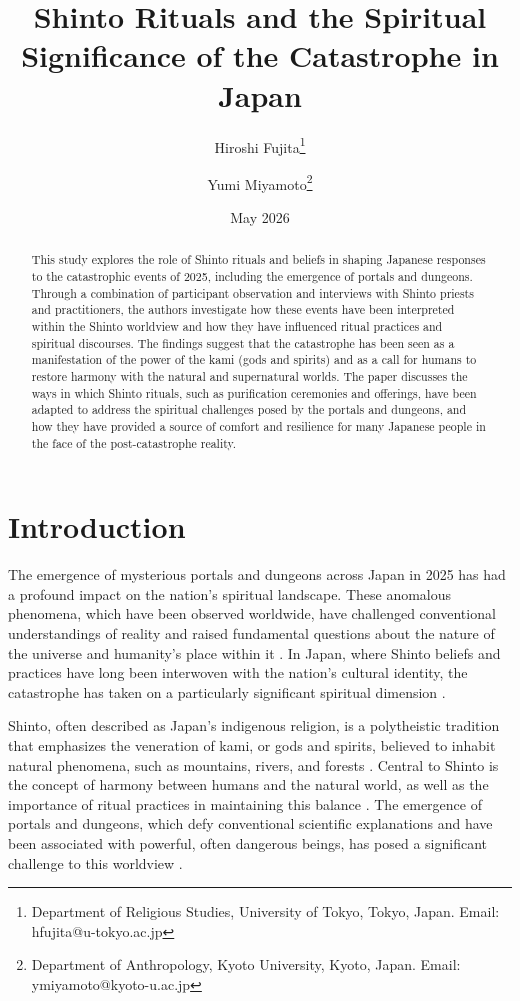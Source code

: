 \documentclass[12pt, a4paper]{article}
\title{Shinto Rituals and the Spiritual Significance of the Catastrophe in Japan}
\author{Hiroshi Fujita\thanks{Department of Religious Studies, University of Tokyo, Tokyo, Japan. Email: hfujita@u-tokyo.ac.jp} \and Yumi Miyamoto\thanks{Department of Anthropology, Kyoto University, Kyoto, Japan. Email: ymiyamoto@kyoto-u.ac.jp}}
\date{May 2026}
\begin{document}
\maketitle

\begin{abstract}
This study explores the role of Shinto rituals and beliefs in shaping Japanese responses to the catastrophic events of 2025, including the emergence of portals and dungeons. Through a combination of participant observation and interviews with Shinto priests and practitioners, the authors investigate how these events have been interpreted within the Shinto worldview and how they have influenced ritual practices and spiritual discourses. The findings suggest that the catastrophe has been seen as a manifestation of the power of the kami (gods and spirits) and as a call for humans to restore harmony with the natural and supernatural worlds. The paper discusses the ways in which Shinto rituals, such as purification ceremonies and offerings, have been adapted to address the spiritual challenges posed by the portals and dungeons, and how they have provided a source of comfort and resilience for many Japanese people in the face of the post-catastrophe reality.
\end{abstract}

\section{Introduction}
The emergence of mysterious portals and dungeons across Japan in 2025 has had a profound impact on the nation's spiritual landscape. These anomalous phenomena, which have been observed worldwide, have challenged conventional understandings of reality and raised fundamental questions about the nature of the universe and humanity's place within it \citep{nakamura2026}. In Japan, where Shinto beliefs and practices have long been interwoven with the nation's cultural identity, the catastrophe has taken on a particularly significant spiritual dimension \citep{yamamoto2027}.

Shinto, often described as Japan's indigenous religion, is a polytheistic tradition that emphasizes the veneration of kami, or gods and spirits, believed to inhabit natural phenomena, such as mountains, rivers, and forests \citep{hardacre2017}. Central to Shinto is the concept of harmony between humans and the natural world, as well as the importance of ritual practices in maintaining this balance \citep{nelson2000}. The emergence of portals and dungeons, which defy conventional scientific explanations and have been associated with powerful, often dangerous beings, has posed a significant challenge to this worldview \citep{sato2026}.
\end{document}
